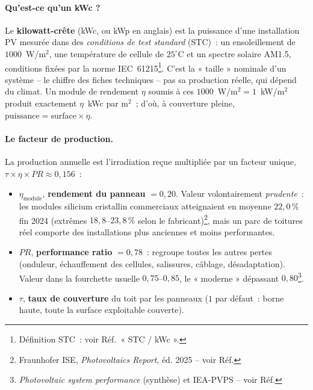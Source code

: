 \documentclass[11pt,a4paper]{article}
\begin{document}
\paragraph{Qu'est-ce qu'un kWc ?} Le \textbf{kilowatt-crête} (kWc, ou kWp en
anglais) est la puissance d'une installation PV mesurée dans des
\emph{conditions de test standard} (STC)~: un ensoleillement de $1000$~W/m$^2$,
une température de cellule de $25^\circ$C et un spectre solaire AM1.5, conditions
fixées par la norme IEC~61215\footnote{Définition STC~: voir Réf.~« STC / kWc ».}.
C'est la « taille » nominale d'un système -- le chiffre des fiches techniques --
pas sa production réelle, qui dépend du climat. Un module de rendement $\eta$
soumis à ces $1000$~W/m$^2 = 1$~kW/m$^2$ produit exactement $\eta$~kWc par m$^2$~;
d'où, à couverture pleine, $\text{puissance} = \text{surface}\times\eta$.

\paragraph{Le facteur de production.} La production annuelle est l'irradiation
reçue multipliée par un facteur unique, $\tau\times\eta\times PR \approx 0{,}156$~:
\begin{itemize}
  \item $\eta_{\text{module}}$, \textbf{rendement du panneau} $= 0{,}20$. Valeur
    volontairement \emph{prudente}~: les modules silicium cristallin commerciaux
    atteignaient en moyenne $22{,}0\,\%$ fin 2024 (extrêmes $18{,}8$--$23{,}8\,\%$
    selon le fabricant)\footnote{Fraunhofer ISE, \emph{Photovoltaics Report}, éd.
    2025 -- voir Réf.}, mais un parc de toitures réel comporte des installations
    plus anciennes et moins performantes.
  \item $PR$, \textbf{performance ratio} $= 0{,}78$~: regroupe toutes les autres
    pertes (onduleur, échauffement des cellules, salissures, câblage,
    désadaptation). Valeur dans la fourchette usuelle $0{,}75$--$0{,}85$, le
    « moderne » dépassant $0{,}80$\footnote{\emph{Photovoltaic system
    performance} (synthèse) et IEA-PVPS -- voir Réf.}.
  \item $\tau$, \textbf{taux de couverture} du toit par les panneaux ($1$ par
    défaut~: borne haute, toute la surface exploitable couverte).
\end{itemize}
\end{document}
